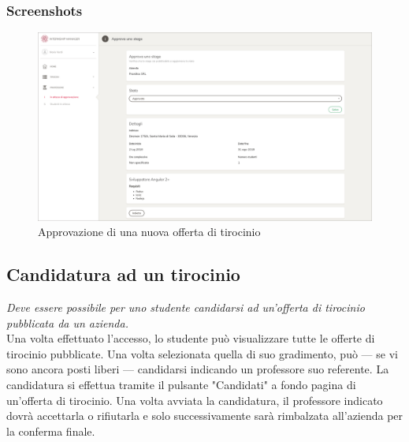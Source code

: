 \subsubsection{Screenshots}
\begin{figure}[H]
	\centering
	\includegraphics[width=1\textwidth]{Figs/screenshots/internshipapprove}     
	\caption[Screenshot: approvazione di una nuova offerta di tirocinio]{Approvazione di una nuova offerta di tirocinio}
	\label{fig:screenshot:3}
\end{figure}

\pagebreak
\subsection{Candidatura ad un tirocinio}

\textit{Deve essere possibile per uno studente candidarsi ad un'offerta di tirocinio pubblicata da un azienda.} \\

\noindent
Una volta effettuato l'accesso, lo studente può visualizzare tutte le offerte di tirocinio pubblicate. Una volta selezionata quella di suo gradimento, può --- se vi sono ancora posti liberi --- candidarsi indicando un professore suo referente. La candidatura si effettua tramite il pulsante "Candidati" a fondo pagina di un'offerta di tirocinio. Una volta avviata la candidatura, il professore indicato dovrà accettarla o rifiutarla e solo successivamente sarà rimbalzata all'azienda per la conferma finale.

